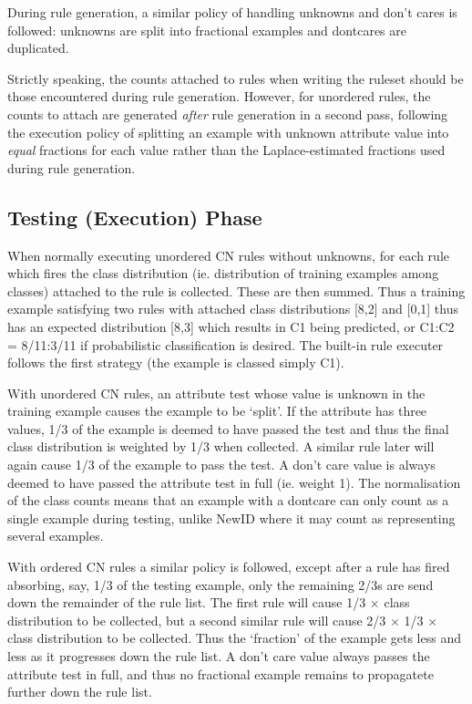 During rule generation, a similar policy of handling unknowns and don't
cares is followed: unknowns are split into fractional examples and
dontcares are duplicated.

Strictly speaking, the counts attached to rules when writing the ruleset
should be those encountered during rule generation. However, for unordered
rules, the counts to attach are generated {\it after} rule generation in
a second pass, following the execution policy of splitting an example
with unknown attribute value into {\it equal} fractions for each value
rather than the Laplace-estimated fractions used during rule generation.

\subsection{Testing (Execution) Phase}

When normally executing unordered CN rules without unknowns, for each
rule which fires the class distribution (ie. distribution of training 
examples among classes) attached to the rule is collected. These are then
summed. Thus a training example satisfying two rules with attached
class distributions [8,2] and [0,1] thus has an expected distribution [8,3]
which results in C1 being predicted, or C1:C2 = 8/11:3/11 if probabilistic
classification is desired. The built-in rule executer follows the first
strategy (the example is classed simply C1).

With unordered CN rules, an attribute test whose value is unknown in the
training example causes the example to be `split'. If the attribute has
three values, 1/3 of the example is deemed to have passed the test and
thus the final class distribution is weighted by 1/3 when collected. A
similar rule later will again cause 1/3 of the example to pass the test.
A don't care value is always deemed to have passed the attribute test in
full (ie. weight 1). The normalisation of the class counts means that 
an example with a dontcare can only count as a single example during testing,
unlike NewID where it may count as representing several examples.

With ordered CN rules a similar policy is followed, except after a rule
has fired absorbing, say, 1/3 of the testing example, only the remaining
2/3s are send down the remainder of the rule list. The first rule will
cause 1/3 $\times$ 
class distribution to be collected, but a second similar rule will
cause 2/3 $\times$ 1/3 $\times$ class distribution to be collected. Thus 
the `fraction'
of the example gets less and less as it progresses down the rule list.
A don't care value always passes the attribute test in full, and thus
no fractional example remains to propagatete further down the rule list.





